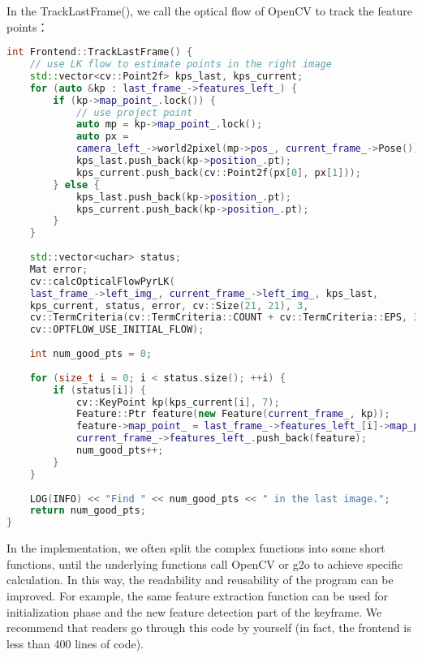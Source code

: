 In the TrackLastFrame(), we call the optical flow of OpenCV to track the feature points：
\begin{lstlisting}[language=c++,caption=slambook2/ch13/src/frontend.cpp]
int Frontend::TrackLastFrame() {
	// use LK flow to estimate points in the right image
	std::vector<cv::Point2f> kps_last, kps_current;
	for (auto &kp : last_frame_->features_left_) {
		if (kp->map_point_.lock()) {
			// use project point
			auto mp = kp->map_point_.lock();
			auto px =
			camera_left_->world2pixel(mp->pos_, current_frame_->Pose());
			kps_last.push_back(kp->position_.pt);
			kps_current.push_back(cv::Point2f(px[0], px[1]));
		} else {
			kps_last.push_back(kp->position_.pt);
			kps_current.push_back(kp->position_.pt);
		}
	}
	
	std::vector<uchar> status;
	Mat error;
	cv::calcOpticalFlowPyrLK(
	last_frame_->left_img_, current_frame_->left_img_, kps_last,
	kps_current, status, error, cv::Size(21, 21), 3,
	cv::TermCriteria(cv::TermCriteria::COUNT + cv::TermCriteria::EPS, 30, 0.01),
	cv::OPTFLOW_USE_INITIAL_FLOW);
	
	int num_good_pts = 0;
	
	for (size_t i = 0; i < status.size(); ++i) {
		if (status[i]) {
			cv::KeyPoint kp(kps_current[i], 7);
			Feature::Ptr feature(new Feature(current_frame_, kp));
			feature->map_point_ = last_frame_->features_left_[i]->map_point_;
			current_frame_->features_left_.push_back(feature);
			num_good_pts++;
		}
	}
	
	LOG(INFO) << "Find " << num_good_pts << " in the last image.";
	return num_good_pts;
}
\end{lstlisting}

In the implementation, we often split the complex functions into some short functions, until the underlying functions call OpenCV or g2o to achieve specific calculation. In this way, the readability and reusability of the program can be improved. For example, the same feature extraction function can be used for initialization phase and the new feature detection part of the keyframe. We recommend that readers go through this code by yourself (in fact, the frontend is less than 400 lines of code).


